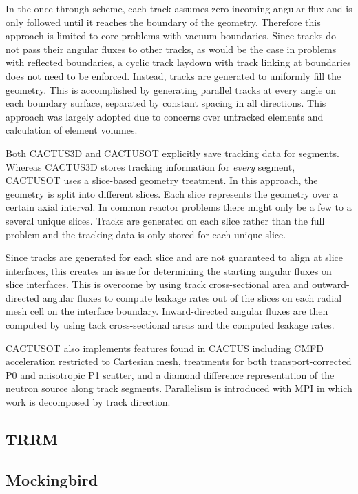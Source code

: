 In the once-through scheme, each track assumes zero incoming angular flux and is only followed until it reaches the boundary of the geometry. Therefore this approach is limited to core problems with vacuum boundaries. Since tracks do not pass their angular fluxes to other tracks, as would be the case in problems with reflected boundaries, a cyclic track laydown with track linking at boundaries does not need to be enforced. Instead, tracks are generated to uniformly fill the geometry. This is accomplished by generating parallel tracks at every angle on each boundary surface, separated by constant spacing in all directions. This approach was largely adopted due to concerns over untracked elements and calculation of element volumes.

Both CACTUS3D and CACTUSOT explicitly save tracking data for segments. Whereas CACTUS3D stores tracking information for \textit{every} segment, CACTUSOT uses a slice-based geometry treatment. In this approach, the geometry is split into different slices. Each slice represents the geometry over a certain axial interval. In common reactor problems there might only be a few to a several unique slices. Tracks are generated on each slice rather than the full problem and the tracking data is only stored for each unique slice. 

Since tracks are generated for each slice and are not guaranteed to align at slice interfaces, this creates an issue for determining the starting angular fluxes on slice interfaces. This is overcome by using track cross-sectional area and outward-directed angular fluxes to compute leakage rates out of the slices on each radial mesh cell on the interface boundary. Inward-directed angular fluxes are then computed by using tack cross-sectional areas and the computed leakage rates.

CACTUSOT also implements features found in CACTUS including \ac{CMFD} acceleration restricted to Cartesian mesh, treatments for both transport-corrected P0 and anisotropic P1 scatter, and a diamond difference representation of the neutron source along track segments. Parallelism is introduced with \ac{MPI} in which work is decomposed by track direction.

\subsection{TRRM}
\label{sec:trrm}

\subsection{Mockingbird}
\label{sec:mockingbird}